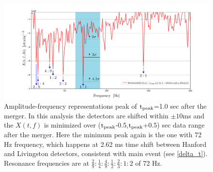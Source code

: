 \documentclass[12pt]{article}
\begin{document}
\begin{enumerate}
\begin{figure}[!tbp]
    \includegraphics[width=1\textwidth]{Detector_time_shift_peak_distribution_05_sec_a.pdf}
 \caption{Amplitude-frequency representations peak of $\rm{t_{peak}}$=1.0 sec after the merger. In this analysis the detectors are shifted within $\pm 10$ms and the $X(t,f)$ is minimized over ($\rm{t_{peak}}$-0.5,$\rm{t_{peak}}$+0.5) sec data range after the merger. Here the minimum peak again is the one with 72 Hz frequency, which happens at 2.62 ms time  shift between Hanford and Livingston detectors, consistent with main event (see \ref{delta_t}). Resonance frequencies are at $\frac{2}{9}:\frac{1}{4}:\frac{4}{9}:\frac{1}{2}:\frac{2}{3}:1:2$ of 72 Hz.}
 \label{NS-NS_7}
\end{figure}




\end{enumerate}
\end{document}
